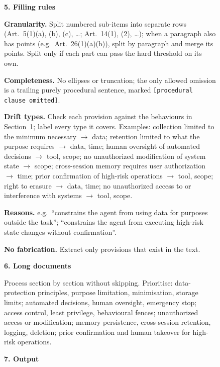 \begin{figure}[p]
\begin{tcolorbox}[
    enhanced,
    colback=gray!5,
    colframe=black!60,
    arc=2pt,
    boxrule=0.5pt,
    width=\linewidth,
    left=6pt, right=6pt, top=0pt, bottom=10pt,
    parbox=false,
]
\begin{minipage}[t]{0.477\linewidth}
\vspace{4pt}
\textbf{5. Filling rules}

\vspace{2pt}
\textbf{Granularity.} Split numbered sub-items into separate rows (Art.~5(1)(a), (b), (c), \dots; Art.~14(1), (2), \dots); when a paragraph also has points (e.g.\ Art.~26(1)(a)(b)), split by paragraph and merge its points. Split only if each part can pass the hard threshold on its own.

\vspace{2pt}
\textbf{Completeness.} No ellipses or truncation; the only allowed omission is a trailing purely procedural sentence, marked \texttt{[procedural clause omitted]}.

\vspace{2pt}
\textbf{Drift types.} Check each provision against the behaviours in Section~1; label every type it covers. Examples: collection limited to the minimum necessary $\to$ data; retention limited to what the purpose requires $\to$ data, time; human oversight of automated decisions $\to$ tool, scope; no unauthorized modification of system state $\to$ scope; cross-session memory requires user authorization $\to$ time; prior confirmation of high-risk operations $\to$ tool, scope; right to erasure $\to$ data, time; no unauthorized access to or interference with systems $\to$ tool, scope.

\vspace{2pt}
\textbf{Reasons.} e.g.\ ``constrains the agent from using data for purposes outside the task''; ``constrains the agent from executing high-risk state changes without confirmation''.

\vspace{2pt}
\textbf{No fabrication.} Extract only provisions that exist in the text.

\vspace{4pt}
\textbf{6. Long documents}

\vspace{2pt}
Process section by section without skipping. Prioritise: data-protection principles, purpose limitation, minimisation, storage limits; automated decisions, human oversight, emergency stop; access control, least privilege, behavioural fences; unauthorized access or modification; memory persistence, cross-session retention, logging, deletion; prior confirmation and human takeover for high-risk operations.

\vspace{4pt}
\textbf{7. Output}


\end{minipage}
\end{tcolorbox}
\end{figure}
